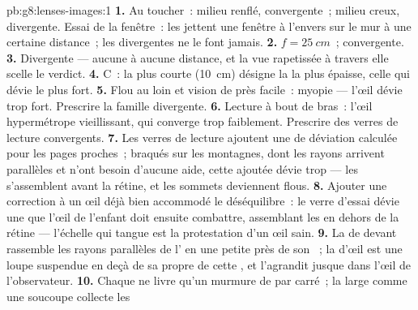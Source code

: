 \begin{solution}{pb:g8:lenses-images:1}
\textbf{1.} Au toucher~: milieu renflé, convergente~; milieu creux,
divergente. Essai de la fenêtre~: les  jettent
une fenêtre à l'envers sur le mur à une certaine distance~; les
divergentes ne le font jamais.
\textbf{2.} $f = \qty{25}{cm}$~; convergente.
\textbf{3.} Divergente --- aucune  à aucune distance, et
la vue rapetissée à travers elle scelle le verdict.
\textbf{4.} C~: la plus courte  (\qty{10}{cm}) désigne
la  la plus épaisse, celle qui dévie le plus fort.
\textbf{5.} Flou au loin et vision de près facile~: myopie ---
l'œil dévie trop fort. Prescrire la famille divergente.
\textbf{6.} Lecture à bout de bras~: l'œil hypermétrope vieillissant,
qui converge trop faiblement. Prescrire des verres de lecture
convergents.
\textbf{7.} Les verres de lecture ajoutent une  de déviation
calculée pour les pages proches~; braqués sur les montagnes, dont les
rayons arrivent parallèles et n'ont besoin d'aucune aide, cette 
ajoutée dévie trop --- les  s'assemblent avant la rétine, et
les sommets deviennent flous.
\textbf{8.} Ajouter une correction à un œil déjà bien accommodé le
déséquilibre~: le verre d'essai dévie une  que l'œil de
l'enfant doit ensuite combattre, assemblant les  en dehors de la
rétine --- l'échelle qui tangue est la protestation d'un œil sain.
\textbf{9.} La  de devant rassemble les rayons parallèles de
l' en une petite  près de son ~; la 
d'œil est une loupe suspendue en deçà de sa propre  de
cette , et l'agrandit jusque dans l'œil de l'observateur.
\textbf{10.} Chaque  ne livre qu'un murmure de  par
 carré~; la  large comme une soucoupe collecte les

\end{solution}

